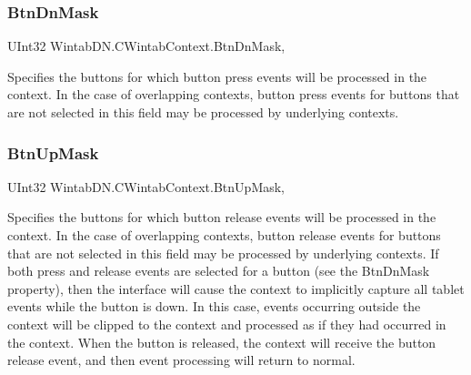 \subsubsection{\texorpdfstring{Btn\+Dn\+Mask}{BtnDnMask}}
{\footnotesize\ttfamily U\+Int32 Wintab\+D\+N.\+C\+Wintab\+Context.\+Btn\+Dn\+Mask\hspace{0.3cm}{\ttfamily [get]}, {\ttfamily [set]}}



Specifies the buttons for which button press events will be processed in the context. In the case of overlapping contexts, button press events for buttons that are not selected in this field may be processed by underlying contexts. 

\mbox{\label{class_wintab_d_n_1_1_c_wintab_context_af90630abd6dc8926709bbf875744de8c}} 
\subsubsection{\texorpdfstring{Btn\+Up\+Mask}{BtnUpMask}}
{\footnotesize\ttfamily U\+Int32 Wintab\+D\+N.\+C\+Wintab\+Context.\+Btn\+Up\+Mask\hspace{0.3cm}{\ttfamily [get]}, {\ttfamily [set]}}



Specifies the buttons for which button release events will be processed in the context. In the case of overlapping contexts, button release events for buttons that are not selected in this field may be processed by underlying contexts. If both press and release events are selected for a button (see the Btn\+Dn\+Mask property), then the interface will cause the context to implicitly capture all tablet events while the button is down. In this case, events occurring outside the context will be clipped to the context and processed as if they had occurred in the context. When the button is released, the context will receive the button release event, and then event processing will return to normal. 

\mbox{\label{class_wintab_d_n_1_1_c_wintab_context_a1f56c63dab67a86ba44b53bce0bc882a}} 
